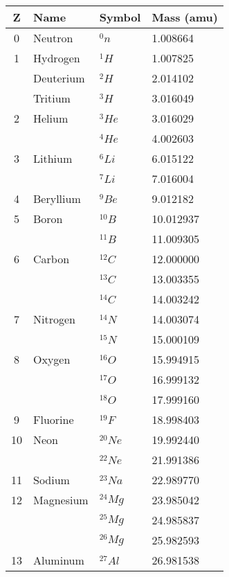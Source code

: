 \begin{margintable}[0pt]
  \footnotesize%
  \begin{center}
    \begin{tabular}{clll}
      \toprule
     Z & Name & Symbol & Mass (amu) \\
      \midrule
     0    & Neutron & ${}^0n$ & 1.008664 \\
     1    & Hydrogen & ${}^1H$ & 1.007825 \\
           & Deuterium& ${}^2H$ & 2.014102 \\
           & Tritium & ${}^3H$ & 3.016049 \\
       2  & Helium & ${}^3He$ & 3.016029 \\
           &              & ${}^4He$ & 4.002603 \\
      3    & Lithium & ${}^6Li$ & 6.015122 \\
           &              & ${}^7Li$ & 7.016004 \\
      4   & Beryllium & ${}^9Be$ & 9.012182 \\
      5   & Boron & ${}^{10}B$ & 10.012937 \\
           &            & ${}^{11}B$ & 11.009305 \\
      6   & Carbon & ${}^{12}C$ & 12.000000 \\
                       &  & ${}^{13}C$ & 13.003355 \\
                      &  & ${}^{14}C$ & 14.003242 \\
      7   & Nitrogen & ${}^{14}N$ & 14.003074 \\
                     & & ${}^{15}N$ & 15.000109 \\
      8   & Oxygen & ${}^{16}O$ & 15.994915 \\
      & & ${}^{17}O$ & 16.999132 \\
      & & ${}^{18}O$ & 17.999160 \\
      9   & Fluorine & ${}^{19}F$ & 18.998403 \\
      10   & Neon & ${}^{20}Ne$ & 19.992440 \\
       & & ${}^{22}Ne$ & 21.991386 \\
      11 & Sodium & ${}^{23}Na$ & 22.989770 \\
      12   & Magnesium & ${}^{24}Mg$ & 23.985042 \\
        & & ${}^{25}Mg$ & 24.985837 \\
        & & ${}^{26}Mg$ & 25.982593 \\
      13   & Aluminum & ${}^{27}Al$ & 26.981538 \\

\end{tabular}
\end{center}
\end{margintable}
